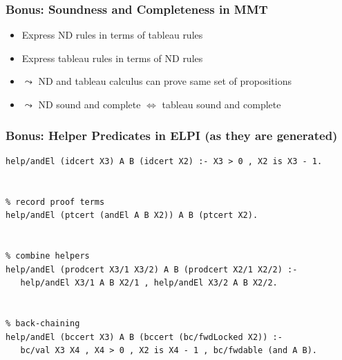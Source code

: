 \documentclass{beamer}
\begin{document}
\appendix

\begin{frame}
    \frametitle{Bonus: Soundness and Completeness in MMT}
    \centering


    \vspace{2em}
    \begin{itemize}
        \item Express ND rules in terms of tableau rules
        \item Express tableau rules in terms of ND rules
        \item $\leadsto$ ND and tableau calculus can prove same set of propositions
        \item $\leadsto$ ND sound and complete $\Leftrightarrow$ tableau sound and complete
    \end{itemize}
\end{frame}

\begin{frame}[fragile]
    \frametitle{Bonus: Helper Predicates in ELPI (as they are generated)}
    \begin{lstlisting}[language=ELPI]
% iterative deepening
help/andEl (idcert X3) A B (idcert X2) :- X3 > 0 , X2 is X3 - 1.


% record proof terms
help/andEl (ptcert (andEl A B X2)) A B (ptcert X2).


% combine helpers
help/andEl (prodcert X3/1 X3/2) A B (prodcert X2/1 X2/2) :-
   help/andEl X3/1 A B X2/1 , help/andEl X3/2 A B X2/2.


% back-chaining
help/andEl (bccert X3) A B (bccert (bc/fwdLocked X2)) :-
   bc/val X3 X4 , X4 > 0 , X2 is X4 - 1 , bc/fwdable (and A B).
    \end{lstlisting}
\end{frame}
\end{document}
